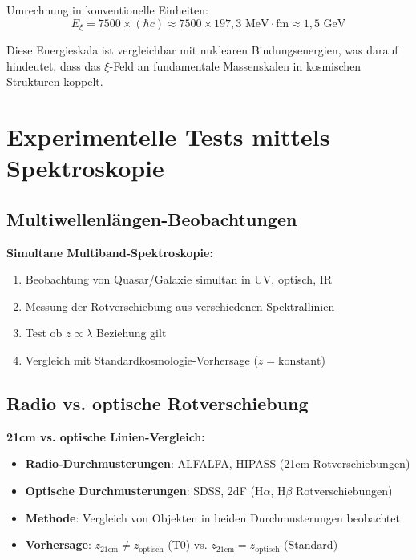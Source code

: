 \documentclass[12pt,a4paper]{article}
\newcommand{\Exi}{E_\xi}
\theoremstyle{definition}
\begin{document}
	Umrechnung in konventionelle Einheiten:
	\begin{equation}
		\Exi = 7500 \times (\hbar c) \approx 7500 \times 197,3 \text{ MeV} \cdot \text{fm} \approx 1,5 \text{ GeV}
	\end{equation}
	
	Diese Energieskala ist vergleichbar mit nuklearen Bindungsenergien, was darauf hindeutet, dass das $\xi$-Feld an fundamentale Massenskalen in kosmischen Strukturen koppelt.
	
	\section{Experimentelle Tests mittels Spektroskopie}
	\label{sec:experimental_tests}
	
	\subsection{Multiwellenl\"angen-Beobachtungen}
	
	\begin{experiment}
		\textbf{Simultane Multiband-Spektroskopie:}
		\begin{enumerate}
			\item Beobachtung von Quasar/Galaxie simultan in UV, optisch, IR
			\item Messung der Rotverschiebung aus verschiedenen Spektrallinien
			\item Test ob $z \propto \lambda$ Beziehung gilt
			\item Vergleich mit Standardkosmologie-Vorhersage ($z = \text{konstant}$)
		\end{enumerate}
	\end{experiment}
	
	\subsection{Radio vs. optische Rotverschiebung}
	
	\begin{experiment}
		\textbf{21cm vs. optische Linien-Vergleich:}
		\begin{itemize}
			\item \textbf{Radio-Durchmusterungen}: ALFALFA, HIPASS (21cm Rotverschiebungen)
			\item \textbf{Optische Durchmusterungen}: SDSS, 2dF (H$\alpha$, H$\beta$ Rotverschiebungen)
			\item \textbf{Methode}: Vergleich von Objekten in beiden Durchmusterungen beobachtet
			\item \textbf{Vorhersage}: $z_{21\text{cm}} \neq z_{\text{optisch}}$ (T0) vs. $z_{21\text{cm}} = z_{\text{optisch}}$ (Standard)
		\end{itemize}
	\end{experiment}
	
\end{document}
